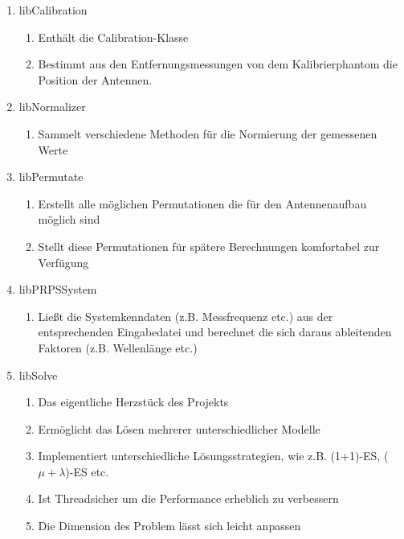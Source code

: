 \begin{enumerate}
%
\item libCalibration
	\begin{enumerate}
	\item Enthält die Calibration-Klasse
	\item Bestimmt aus den Entfernungsmessungen von dem Kalibrierphantom die Position der Antennen.
	\end{enumerate}
%	
\item libNormalizer
	\begin{enumerate}
	\item Sammelt verschiedene Methoden für die Normierung der gemessenen Werte
	\end{enumerate}
%	
\item libPermutate
	\begin{enumerate}
	\item Erstellt alle möglichen Permutationen die für den Antennenaufbau möglich sind
	\item Stellt diese Permutationen für spätere Berechnungen komfortabel zur Verfügung
	\end{enumerate}
%
\item libPRPSSystem
	\begin{enumerate}
	\item Ließt die Systemkenndaten (z.B. Messfrequenz etc.) aus der entsprechenden Eingabedatei und berechnet die sich daraus ableitenden Faktoren (z.B. Wellenlänge etc.)
	\end{enumerate}
%
\item libSolve
	\begin{enumerate}
	\item Das eigentliche Herzstück des Projekts
	\item Ermöglicht das Lösen mehrerer unterschiedlicher Modelle
	\item Implementiert unterschiedliche Lösungsstrategien, wie z.B. (1+1)-ES, ($\mu+\lambda$)-ES etc.
	\item Ist Threadsicher um die Performance erheblich zu verbessern
	\item Die Dimension des Problem lässt sich leicht anpassen
	\end{enumerate}
%
\end{enumerate}